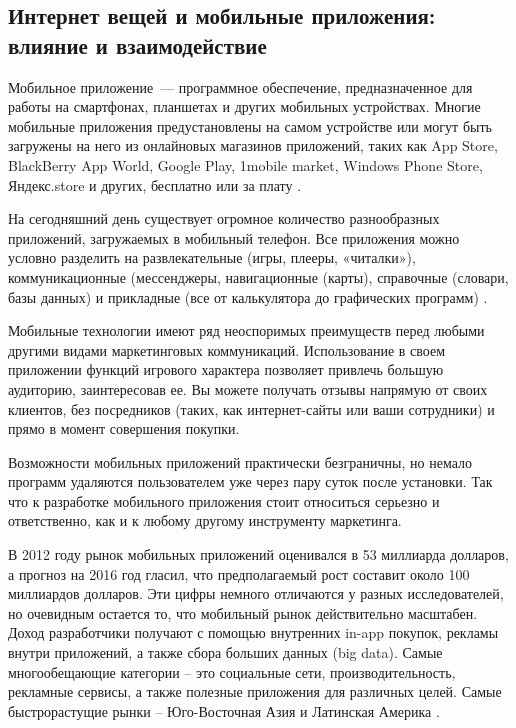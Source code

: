 \subsection{Интернет вещей и мобильные приложения: влияние и взаимодействие}
\label{sec:subject:mobile}

Мобильное приложение~--- программное обеспечение, предназначенное для работы на смартфонах, планшетах и других мобильных устройствах. Многие мобильные приложения предустановлены на самом устройстве или могут быть загружены на него из онлайновых магазинов приложений, таких как App Store, BlackBerry App World, Google Play, 1mobile market, Windows Phone Store, Яндекс.store и других, бесплатно или за плату \cite{wiki_mobile_def}.

На сегодняшний день существует огромное количество разнообразных приложений, загружаемых в мобильный телефон. Все приложения можно условно разделить на развлекательные (игры, плееры, «читалки»), коммуникационные (мессенджеры, навигационные (карты), справочные (словари, базы данных) и прикладные (все от калькулятора до графических программ) \cite{mobile_business}.

Мобильные технологии имеют ряд неоспоримых преимуществ перед любыми другими видами маркетинговых коммуникаций. Использование в своем приложении функций игрового характера позволяет привлечь большую аудиторию, заинтересовав ее. Вы можете получать отзывы напрямую от своих клиентов, без посредников (таких, как интернет-сайты или ваши сотрудники) и прямо в момент совершения покупки.

Возможности мобильных приложений практически безграничны, но немало программ удаляются пользователем уже через пару суток после установки. Так что к разработке мобильного приложения стоит относиться серьезно и ответственно, как и к любому другому инструменту маркетинга.

В 2012 году рынок мобильных приложений оценивался в 53 миллиарда долларов, а прогноз на 2016 год гласил, что предполагаемый рост составит около 100 миллиардов долларов. Эти цифры немного отличаются у разных исследователей, но очевидным остается то, что мобильный рынок действительно масштабен. Доход разработчики получают с помощью внутренних in-app покупок, рекламы внутри приложений, а также сбора больших данных (big data). Самые многообещающие категории – это социальные сети, производительность, рекламные сервисы, а также полезные приложения для различных целей. Самые быстрорастущие рынки – Юго-Восточная Азия и Латинская Америка \cite{mobile_market}.

